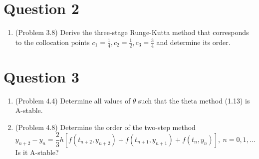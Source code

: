 \documentclass[10pt]{report}
\begin{document}
\section*{Question 2}
\begin{enumerate}
	\item 
	(Problem 3.8) Derive the three-stage Runge-Kutta method that corresponds to the collocation points $c_1 = \frac{1}{4}, c_2 = \frac{1}{2}, c_3 = \frac{3}{4}$ and determine its order.
\end{enumerate}

\section*{Question 3}
\begin{enumerate}
	\item 
	(Problem 4.4) Determine all values of $\theta$ such that the theta method (1.13) is A-stable.
	
	\item 
	(Problem 4.8) Determine the order of the two-step method
	\[
	y_{n+2} - y_n = \frac{2}{3}h[f(t_{n+2},y_{n+2}) + f(t_{n+1},y_{n+1}) + f(t_{n},y_{n})],\ n=0,1,\dots
	\]
	Is it A-stable?
\end{enumerate}
\end{document}
